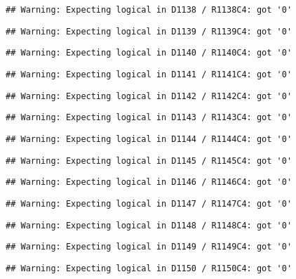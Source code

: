 \documentclass[
]{article}
\begin{document}
\begin{verbatim}
## Warning: Expecting logical in D1138 / R1138C4: got '0'
\end{verbatim}

\begin{verbatim}
## Warning: Expecting logical in D1139 / R1139C4: got '0'
\end{verbatim}

\begin{verbatim}
## Warning: Expecting logical in D1140 / R1140C4: got '0'
\end{verbatim}

\begin{verbatim}
## Warning: Expecting logical in D1141 / R1141C4: got '0'
\end{verbatim}

\begin{verbatim}
## Warning: Expecting logical in D1142 / R1142C4: got '0'
\end{verbatim}

\begin{verbatim}
## Warning: Expecting logical in D1143 / R1143C4: got '0'
\end{verbatim}

\begin{verbatim}
## Warning: Expecting logical in D1144 / R1144C4: got '0'
\end{verbatim}

\begin{verbatim}
## Warning: Expecting logical in D1145 / R1145C4: got '0'
\end{verbatim}

\begin{verbatim}
## Warning: Expecting logical in D1146 / R1146C4: got '0'
\end{verbatim}

\begin{verbatim}
## Warning: Expecting logical in D1147 / R1147C4: got '0'
\end{verbatim}

\begin{verbatim}
## Warning: Expecting logical in D1148 / R1148C4: got '0'
\end{verbatim}

\begin{verbatim}
## Warning: Expecting logical in D1149 / R1149C4: got '0'
\end{verbatim}

\begin{verbatim}
## Warning: Expecting logical in D1150 / R1150C4: got '0'
\end{verbatim}
\end{document}
